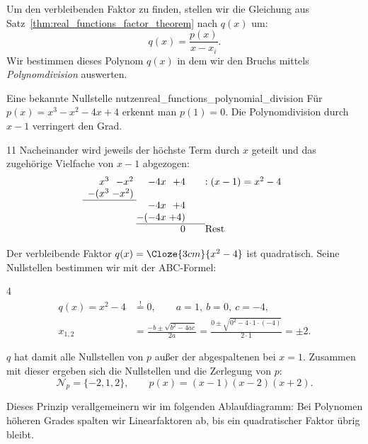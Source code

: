 Um den verbleibenden Faktor zu finden, stellen wir die Gleichung aus
Satz~\ref{thm:real_functions_factor_theorem} nach $q(x)$ um:
\[
  q(x)=\frac{p(x)}{x-x_i}.
\]
Wir bestimmen dieses Polynom $q(x)$ in dem wir den Bruchs mittels \emph{Polynomdivision}
 auswerten.

\begin{ExampleBox}{Eine bekannte Nullstelle nutzen}{real_functions_polynomial_division}
  Für $p(x)=x^3-x^2-4x+4$ erkennt man $p(1)=0$.
  Die Polynomdivision durch $x-1$ verringert den Grad.
  \begin{ClozeArea}[34]{11}
    Nacheinander wird jeweils der höchste Term durch $x$ geteilt und das
    zugehörige Vielfache von $x-1$ abgezogen:
    \[
      \begin{array}{r@{\;}r@{\;}r@{\;}r@{\qquad}l}
        x^3&-x^2&-4x&+4&:(x-1)=x^2-4\\
        -(x^3&-x^2)&&&\\ \cline{1-2}
        &&-4x&+4&\\
        &&-(-4x&+4)&\\ \cline{3-4}
        &&&0&\text{Rest}
      \end{array}
    \]
  \end{ClozeArea}
  Der verbleibende Faktor $q(x)=\Cloze{3cm}{x^2-4}$ ist quadratisch.
  Seine Nullstellen bestimmen wir mit der ABC-Formel:
  \begin{ClozeArea}[34]{4}
    \[
      \begin{aligned}
        q(x)=x^2-4&\overset{!}{=}0,\qquad a=1,\ b=0,\ c=-4,\\
        x_{1,2}&=\frac{-b\pm\sqrt{b^2-4ac}}{2a}
        =\frac{0\pm\sqrt{0^2-4\cdot1\cdot(-4)}}{2\cdot1}
        =\pm2.
      \end{aligned}
    \]
  \end{ClozeArea}
  $q$ hat damit alle Nullstellen von $p$ außer der abgespaltenen bei $x=1$.
  Zusammen mit dieser ergeben sich die Nullstellen und die Zerlegung von $p$:
  \[
    \mathcal{N}_p=\{-2,1,2\},\qquad
    p(x)=(x-1)(x-2)(x+2).
  \]
\end{ExampleBox}

\par{}
Dieses Prinzip verallgemeinern wir im folgenden Ablaufdiagramm: Bei Polynomen
höheren Grades spalten wir Linearfaktoren ab, bis ein quadratischer Faktor übrig bleibt.
\par\smallskip
{\centering
  \par}
\smallskip

